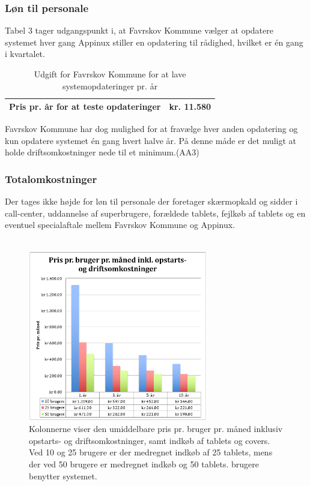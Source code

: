 \subsubsection{Løn til personale}
Tabel 3 tager udgangspunkt i, at Favrskov Kommune vælger at opdatere systemet hver gang Appinux stiller en opdatering til rådighed, hvilket er én gang i kvartalet. 

\begin{table}[H]
	\caption{Udgift for Favrskov Kommune for at lave systemopdateringer pr. år}
	\centering
	\label{tab:tabelpersonaleudgift}
	\begin{tabularx}{\textwidth}{|X|X|}
		\hline
		Pris pr. år for at teste opdateringer
		& kr. 11.580\\ 
		\hline
	\end{tabularx}
\end{table}
Favrskov Kommune har dog mulighed for at fravælge hver anden opdatering og kun opdatere systemet én gang hvert halve år. På denne måde er det muligt at holde driftsomkostninger nede til et minimum.(AA3) 
\subsubsection{Totalomkostninger}
Der tages ikke højde for løn til personale der foretager skærmopkald og sidder i call-center, uddannelse af superbrugere, forældede tablets, fejlkøb af tablets og en eventuel specialaftale mellem Favrskov Kommune og Appinux.\\ \\

\begin{figure}[H]
	\centering
	\includegraphics[width=0.7\textwidth]{Figurer/grafoeko.png}
	\caption{\label{fig:grafoeko}Kolonnerne viser den umiddelbare pris pr. bruger pr. måned inklusiv opstarts- og driftsomkostninger, samt indkøb af tablets og covers. Ved 10 og 25 brugere er der medregnet indkøb af 25 tablets, mens der ved 50 brugere er medregnet indkøb og 50 tablets. brugere benytter systemet.}
\end{figure}

